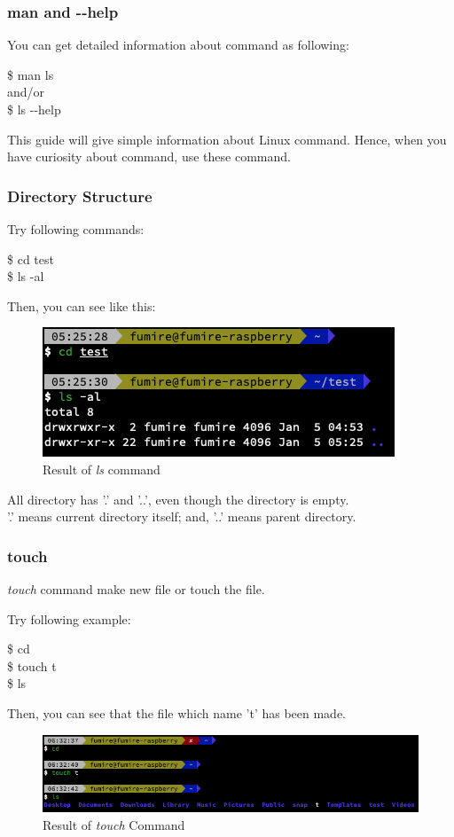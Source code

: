 \documentclass{beamer}
\begin{document}
	\begin{frame}
		\frametitle{man and -$ $-help}
		You can get detailed information about command as following:
		\begin{example}
			\$ man ls \\
			and/or \\
			\$ ls -$ $-help
		\end{example}
		This guide will give simple information about Linux command. Hence, when you have curiosity about command, use these command.
	\end{frame}

	\begin{frame}
		\frametitle{Directory Structure}
		Try following commands:
		\begin{example}
			\$ cd test\\
			\$ ls -al
		\end{example}
		Then, you can see like this:
		\begin{figure}[h!]
			\centering
			\includegraphics[width=0.3 \linewidth]{figures/7.png}
			\caption{Result of \textit{ls} command}
		\end{figure}
		All directory has '.' and '..', even though the directory is empty. \\
		'.' means current directory itself; and, '..' means parent directory.
	\end{frame}

	\begin{frame}
		\frametitle{touch}
		\textit{touch} command make new file or touch the file.
		
		Try following example:
		\begin{example}
			\$ cd \\
			\$ touch t \\
			\$ ls
		\end{example}
		
		Then, you can see that the file which name 't' has been made. 
	
		\begin{figure}[h!]
			\centering
			\includegraphics[width=0.5 \linewidth]{figures/8.png}
			\caption{Result of \textit{touch} Command}
		\end{figure}
	\end{frame}
\end{document}
